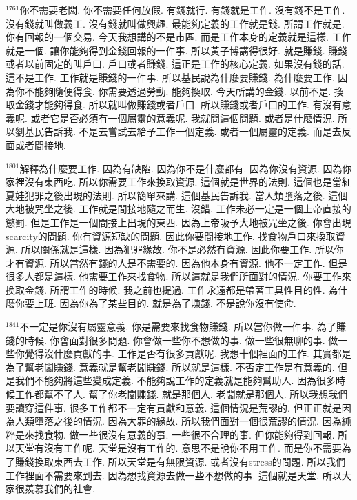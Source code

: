 \documentclass{book}
\begin{document}
$^{1761}$你不需要老闆.
你不需要任何放假.
有錢就行.
有錢就是工作.
沒有錢不是工作.
沒有錢就叫做義工.
沒有錢就叫做興趣.
最能夠定義的工作就是錢.
所謂工作就是.
你有回報的一個交易.
今天我想講的不是市區.
而是工作本身的定義就是這樣.
工作就是一個.
讓你能夠得到金錢回報的一件事.
所以黃子博講得很好.
就是賺錢.
賺錢或者以前固定的叫戶口.
戶口或者賺錢.
這正是工作的核心定義.
如果沒有錢的話.
這不是工作.
工作就是賺錢的一件事.
所以基民說為什麼要賺錢.
為什麼要工作.
因為你不能夠隨便得食.
你需要透過勞動.
能夠換取.
今天所講的金錢.
以前不是.
換取金錢才能夠得食.
所以就叫做賺錢或者戶口.
所以賺錢或者戶口的工作.
有沒有意義呢.
或者它是否必須有一個屬靈的意義呢.
我就問這個問題.
或者是什麼情況.
所以劉基民告訴我.
不是去嘗試去給予工作一個定義.
或者一個屬靈的定義.
而是去反面或者間接地.

$^{1801}$解釋為什麼要工作.
因為有缺陷.
因為你不是什麼都有.
因為你沒有資源.
因為你家裡沒有東西吃.
所以你需要工作來換取資源.
這個就是世界的法則.
這個也是當紅夏娃犯罪之後出現的法則.
所以簡單來講.
這個基民告訴我.
當人類墮落之後.
這個大地被咒坐之後.
工作就是間接地隨之而生.
沒錯.
工作未必一定是一個上帝直接的懲罰.
但是工作是一個間接上出現的東西.
因為上帝吸予大地被咒坐之後.
你會出現scarcity的問題.
你有資源短缺的問題.
因此你要間接地工作.
找食物戶口來換取資源.
所以關係就是這樣.
因為犯罪緣故.
你不是必然有資源.
因此你要工作.
所以你才有資源.
所以當然有錢的人是不需要的.
因為他本身有資源.
他不一定工作.
但是很多人都是這樣.
他需要工作來找食物.
所以這就是我們所面對的情況.
你要工作來換取金錢.
所謂工作的時候.
我之前也提過.
工作永遠都是帶著工具性目的性.
為什麼你要上班.
因為你為了某些目的.
就是為了賺錢.
不是說你沒有使命.

$^{1841}$不一定是你沒有屬靈意義.
你是需要來找食物賺錢.
所以當你做一件事.
為了賺錢的時候.
你會面對很多問題.
你會做一些你不想做的事.
做一些很無聊的事.
做一些你覺得沒什麼貢獻的事.
工作是否有很多貢獻呢.
我想十個裡面的工作.
其實都是為了幫老闆賺錢.
意義就是幫老闆賺錢.
所以就是這樣.
不否定工作是有意義的.
但是我們不能夠將這些變成定義.
不能夠說工作的定義就是能夠幫助人.
因為很多時候工作都幫不了人.
幫了你老闆賺錢.
就是那個人.
老闆就是那個人.
所以我想我們要讀穿這件事.
很多工作都不一定有貢獻和意義.
這個情況是荒謬的.
但正正就是因為人類墮落之後的情況.
因為大罪的緣故.
所以我們面對一個很荒謬的情況.
因為純粹是來找食物.
做一些很沒有意義的事.
一些很不合理的事.
但你能夠得到回報.
所以天堂有沒有工作呢.
天堂是沒有工作的.
意思不是說你不用工作.
而是你不需要為了賺錢換取東西去工作.
所以天堂是有無限資源.
或者沒有stress的問題.
所以我們工作裡面不需要來到去.
因為想找資源去做一些不想做的事.
這個就是天堂.
所以大家很羨慕我們的社會.
\end{document}
